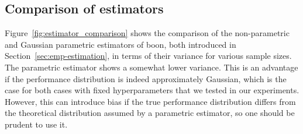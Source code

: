 \documentclass{article}
\newcommand{\tboon}{\gls{boon}\xspace}
\begin{document}
\begin{appendices}





\section{Comparison of estimators}




Figure~\ref{fig:estimator_comparison} shows the comparison of the non-parametric and Gaussian parametric estimators of \tboon, both introduced in Section~\ref{sec:emp-estimation}, in terms of their variance for various sample sizes. The parametric estimator shows a somewhat lower variance. This is an advantage if the performance distribution is indeed approximately Gaussian, which is the case for both cases with fixed hyperparameters that we tested in our experiments. However, this can introduce bias if the true performance distribution differs from the theoretical distribution assumed by a parametric estimator, so one should be prudent to use it.

\end{appendices}











\end{document}
